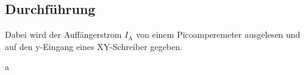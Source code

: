 \subsection{Durchführung}
Dabei wird der Auffängerstrom $I_\text{A}$ von einem Picoamperemeter ausgelesen und auf den y-Eingang eines XY-Schreiber gegeben. 



























a
